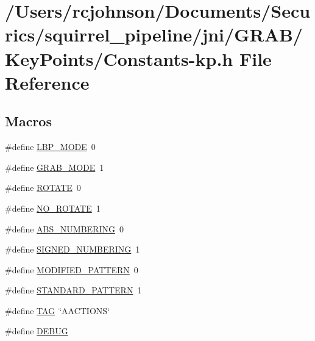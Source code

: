 \hypertarget{_constants-kp_8h}{\section{/\-Users/rcjohnson/\-Documents/\-Securics/squirrel\-\_\-pipeline/jni/\-G\-R\-A\-B/\-Key\-Points/\-Constants-\/kp.h File Reference}
\label{_constants-kp_8h}
}
\subsection*{Macros}
\begin{DoxyCompactItemize}
\item 
\#define \hyperlink{_constants-kp_8h_a6b33b99442f7c7d9e94f003528a86501}{L\-B\-P\-\_\-\-M\-O\-D\-E}~0
\item 
\#define \hyperlink{_constants-kp_8h_a66425a38b0c7937c73f50847524a3595}{G\-R\-A\-B\-\_\-\-M\-O\-D\-E}~1
\item 
\#define \hyperlink{_constants-kp_8h_ae38c87f421906975bf7500c3b779fbd1}{R\-O\-T\-A\-T\-E}~0
\item 
\#define \hyperlink{_constants-kp_8h_ad30aa04d0c2e0be52306deb2c60dff35}{N\-O\-\_\-\-R\-O\-T\-A\-T\-E}~1
\item 
\#define \hyperlink{_constants-kp_8h_a43697bbe14a19b7bfd3bc3a8966ffc24}{A\-B\-S\-\_\-\-N\-U\-M\-B\-E\-R\-I\-N\-G}~0
\item 
\#define \hyperlink{_constants-kp_8h_a591937bc56bfef3fd4e606da1e9bb6e1}{S\-I\-G\-N\-E\-D\-\_\-\-N\-U\-M\-B\-E\-R\-I\-N\-G}~1
\item 
\#define \hyperlink{_constants-kp_8h_a3d2cac756a32f6fc8a16ea6bf5f7fa64}{M\-O\-D\-I\-F\-I\-E\-D\-\_\-\-P\-A\-T\-T\-E\-R\-N}~0
\item 
\#define \hyperlink{_constants-kp_8h_a5daa478426a73c9de86ceb44488ca3d8}{S\-T\-A\-N\-D\-A\-R\-D\-\_\-\-P\-A\-T\-T\-E\-R\-N}~1
\item 
\#define \hyperlink{_constants-kp_8h_afc3d101f633a076cc1ca84b85b6224b2}{T\-A\-G}~\char`\"{}A\-A\-C\-T\-I\-O\-N\-S\char`\"{}
\item 
\#define \hyperlink{_constants-kp_8h_ad72dbcf6d0153db1b8d8a58001feed83}{D\-E\-B\-U\-G}
\end{DoxyCompactItemize}
